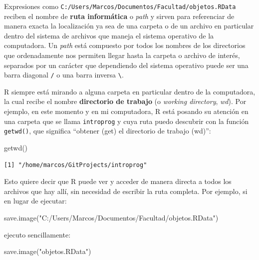 \documentclass[
]{book}
\newenvironment{Shaded}{\begin{snugshade}}{\end{snugshade}}
\newcommand{\FunctionTok}[1]{\textcolor[rgb]{0.00,0.00,0.00}{#1}}
\newcommand{\NormalTok}[1]{#1}
\newcommand{\StringTok}[1]{\textcolor[rgb]{0.31,0.60,0.02}{#1}}
\begin{document}
Expresiones como \texttt{C:/Users/Marcos/Documentos/Facultad/objetos.RData} reciben el nombre de \textbf{ruta informática} o \emph{path} y sirven para referenciar de manera exacta la localización ya sea de una carpeta o de un archivo en particular dentro del sistema de archivos que maneja el sistema operativo de la computadora. Un \emph{path} está compuesto por todos los nombres de los directorios que ordenadamente nos permiten llegar hasta la carpeta o archivo de interés, separados por un carácter que dependiendo del sistema operativo puede ser una barra diagonal \texttt{/} o una barra inversa \texttt{\textbackslash{}}.

R siempre está mirando a alguna carpeta en particular dentro de la computadora, la cual recibe el nombre \textbf{directorio de trabajo} (o \emph{working directory}, \emph{wd}). Por ejemplo, en este momento y en mi computadora, R está posando su atención en una carpeta que se llama \texttt{introprog} y cuya ruta puedo descubrir con la función \texttt{getwd()}, que significa ``obtener (get) el directorio de trabajo (wd)'':

\begin{Shaded}
\begin{Highlighting}[]
\FunctionTok{getwd}\NormalTok{()}
\end{Highlighting}
\end{Shaded}

\begin{verbatim}
[1] "/home/marcos/GitProjects/introprog"
\end{verbatim}

Esto quiere decir que R puede ver y acceder de manera directa a todos los archivos que hay allí, sin necesidad de escribir la ruta completa. Por ejemplo, si en lugar de ejecutar:

\begin{Shaded}
\begin{Highlighting}[]
\FunctionTok{save.image}\NormalTok{(}\StringTok{"C:/Users/Marcos/Documentos/Facultad/objetos.RData"}\NormalTok{)}
\end{Highlighting}
\end{Shaded}

ejecuto sencillamente:

\begin{Shaded}
\begin{Highlighting}[]
\FunctionTok{save.image}\NormalTok{(}\StringTok{"objetos.RData"}\NormalTok{)}
\end{Highlighting}
\end{Shaded}
\end{document}
